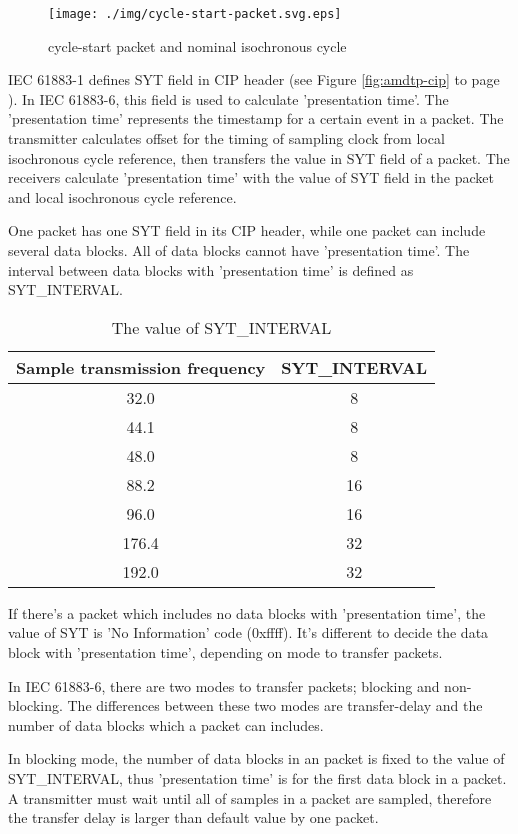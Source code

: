 \documentclass[onecolumn]{article}
\begin{document}
\begin{figure}[htbp]
\centering
\texttt{[image: ./img/cycle-start-packet.svg.eps]}
\caption{{cycle-start packet and nominal isochronous cycle}}
\label{fig:cycle-start}
\end{figure}

IEC 61883-1 defines SYT field in CIP header (see Figure \ref{fig:amdtp-cip} to page \pageref{fig:amdtp-cip}). In IEC 61883-6, this field is used to calculate 'presentation time'. The 'presentation time' represents the timestamp for a certain event in a packet. The transmitter calculates offset for the timing of sampling clock from local isochronous cycle reference, then transfers the value in SYT field of a packet. The receivers calculate 'presentation time' with the value of SYT field in the packet and local isochronous cycle reference.

One packet has one SYT field in its CIP header, while one packet can include several data blocks. All of data blocks cannot have 'presentation time'. The interval between data blocks with 'presentation time' is defined as SYT\_INTERVAL.

\begin{table}[ht]
	\centering
	\caption{{The value of SYT\_INTERVAL}}
	\label{syt_interval}
	\begin{tabular}{cc} \toprule
		Sample transmission frequency & SYT\_INTERVAL \\ \midrule
		32.0	& 8	\\
		44.1	& 8	\\
		48.0	& 8	\\
		88.2	& 16	\\
		96.0	& 16	\\
		176.4	& 32	\\
		192.0	& 32	\\ \bottomrule
	\end{tabular}
\end{table}

If there's a packet which includes no data blocks with 'presentation time', the value of SYT is 'No Information' code (0xffff). It's different to decide the data block with 'presentation time', depending on mode to transfer packets.

In IEC 61883-6\cite{iec61883-6-1,iec61883-6-2}, there are two modes to transfer packets; blocking and non-blocking. The differences between these two modes are transfer-delay and the number of data blocks which a packet can includes.

In blocking mode, the number of data blocks in an packet is fixed to the value of SYT\_INTERVAL, thus 'presentation time' is for the first data block in a packet. A transmitter must wait until all of samples in a packet are sampled, therefore the transfer delay is larger than default value by one packet.
\end{document}
